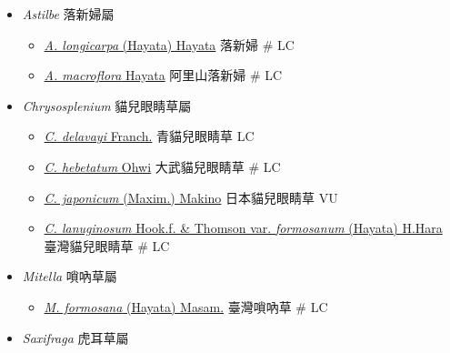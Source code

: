 
  \begin{itemize}
 \item[] \textit{Astilbe} 落新婦屬
                                
  \begin{itemize}
        \item[] \href{http://www.theplantlist.org/tpl1.1/search?q=Astilbe+longicarpa}{\textit{A. longicarpa} (Hayata) Hayata}   落新婦  \# LC
        \item[] \href{http://www.theplantlist.org/tpl1.1/search?q=Astilbe+macroflora}{\textit{A. macroflora} Hayata}   阿里山落新婦  \# LC
  \end{itemize}
 \item[] \textit{Chrysosplenium} 貓兒眼睛草屬
                                
  \begin{itemize}
        \item[] \href{http://www.theplantlist.org/tpl1.1/search?q=Chrysosplenium+delavayi}{\textit{C. delavayi} Franch.}   青貓兒眼睛草   LC
        \item[] \href{http://www.theplantlist.org/tpl1.1/search?q=Chrysosplenium+hebetatum}{\textit{C. hebetatum} Ohwi}   大武貓兒眼睛草  \# LC
        \item[] \href{http://www.theplantlist.org/tpl1.1/search?q=Chrysosplenium+japonicum}{\textit{C. japonicum} (Maxim.) Makino}   日本貓兒眼睛草   VU
        \item[] \href{http://www.theplantlist.org/tpl1.1/search?q=Chrysosplenium+lanuginosum+var.+formosanum}{\textit{C. lanuginosum} Hook.f. \& Thomson var. \textit{formosanum} (Hayata) H.Hara}   臺灣貓兒眼睛草  \# LC
  \end{itemize}
 \item[] \textit{Mitella} 嗩吶草屬
                                
  \begin{itemize}
        \item[] \href{http://www.theplantlist.org/tpl1.1/search?q=Mitella+formosana}{\textit{M. formosana} (Hayata) Masam.}   臺灣嗩吶草  \# LC
  \end{itemize}
 \item[] \textit{Saxifraga} 虎耳草屬
                                

\end{itemize}
